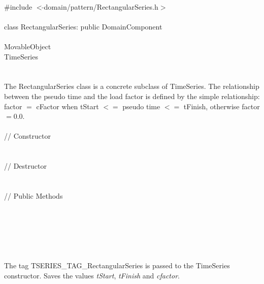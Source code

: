 
   \\
\indent \#include $<\tilde{ }$domain/pattern/RectangularSeries.h$>$  \\

  \\
\indent class RectangularSeries: public DomainComponent  \\

 \\
\indent MovableObject \\
\indent\indent TimeSeries \\
\indent\indent{} \\

 \\ 
\indent The RectangularSeries class is a concrete subclass of TimeSeries.
The relationship between the pseudo time and the load factor is
defined by the simple relationship: factor $=$ cFactor when tStart $<=$
pseudo time $<=$ tFinish, otherwise factor $ =0.0$. \\


 \\
\indent // Constructor \\ 
\\ \\
\indent // Destructor \\ 
\\  \\
\indent // Public Methods \\ 
\\
\\
\\
\\

 \\ 
\\ 
The tag TSERIES\_TAG\_RectangularSeries is passed to the TimeSeries
constructor. Saves the values {\em tStart}, {\em tFinish} and {\em
cfactor}. \\


